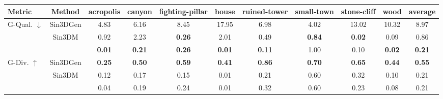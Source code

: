 \begin{tabular}{ l |c|  c  c  c  c  c  c  c  c | c }\toprule
Metric & Method & acropolis & canyon & fighting-pillar & house & ruined-tower & small-town & stone-cliff & wood & average\\\midrule

\multirow{3}{*}{G-Qual. $\downarrow$} & Sin3DGen  &  4.83   &    6.16   &    8.45   &    17.95   &    6.98   &    4.02   &    13.02   &    10.32 &  8.97\\
&Sin3DM  &  0.92   &    2.23   &    \textbf{0.26}   &    2.01   &    0.49   &    \textbf{0.84}   &    \textbf{0.02}   &    0.09 &  0.86\\
&\ourmethod{}  &  \textbf{0.01}   &    \textbf{0.21}   &    \textbf{0.26}   &    \textbf{0.01}   &    \textbf{0.11}   &    1.00   &    0.10   &    \textbf{0.02} &  \textbf{0.21}\\

\midrule
\multirow{3}{*}{G-Div. $\uparrow$} & Sin3DGen  &  \textbf{0.25}   &    \textbf{0.50}   &    \textbf{0.59}   &    \textbf{0.41}   &    \textbf{0.86}   &    \textbf{0.70}   &    \textbf{0.65}   &    \textbf{0.44} &  \textbf{0.55}\\
&Sin3DM  &  0.12   &    0.17   &    0.15   &    0.01   &    0.21   &    0.60   &    0.32   &    0.10 &  0.21\\
&\ourmethod{}  &  0.04   &    0.19   &    0.24   &    0.01   &    0.32   &    0.60   &    0.23   &    0.08 &  0.21\\

\bottomrule

\end{tabular}

